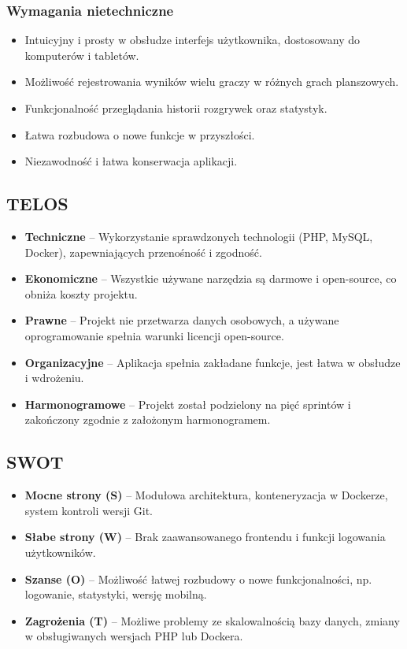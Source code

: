 \documentclass[12pt,a4paper]{article}
\begin{document}
\subsubsection*{Wymagania nietechniczne}
\begin{itemize}
    \item Intuicyjny i prosty w obsłudze interfejs użytkownika, dostosowany do komputerów i tabletów.
    \item Możliwość rejestrowania wyników wielu graczy w różnych grach planszowych.
    \item Funkcjonalność przeglądania historii rozgrywek oraz statystyk.
    \item Łatwa rozbudowa o nowe funkcje w przyszłości.
    \item Niezawodność i łatwa konserwacja aplikacji.
\end{itemize}

\subsection{TELOS}
\begin{itemize}
    \item \textbf{Techniczne} – Wykorzystanie sprawdzonych technologii (PHP, MySQL, Docker), zapewniających przenośność i zgodność.
    \item \textbf{Ekonomiczne} – Wszystkie używane narzędzia są darmowe i open-source, co obniża koszty projektu.
    \item \textbf{Prawne} – Projekt nie przetwarza danych osobowych, a używane oprogramowanie spełnia warunki licencji open-source.
    \item \textbf{Organizacyjne} – Aplikacja spełnia zakładane funkcje, jest łatwa w obsłudze i wdrożeniu.
    \item \textbf{Harmonogramowe} – Projekt został podzielony na pięć sprintów i zakończony zgodnie z założonym harmonogramem.
\end{itemize}

\subsection{SWOT}
\begin{itemize}
    \item \textbf{Mocne strony (S)} – Modułowa architektura, konteneryzacja w Dockerze, system kontroli wersji Git.
    \item \textbf{Słabe strony (W)} – Brak zaawansowanego frontendu i funkcji logowania użytkowników.
    \item \textbf{Szanse (O)} – Możliwość łatwej rozbudowy o nowe funkcjonalności, np. logowanie, statystyki, wersję mobilną.
    \item \textbf{Zagrożenia (T)} – Możliwe problemy ze skalowalnością bazy danych, zmiany w obsługiwanych wersjach PHP lub Dockera.
\end{itemize}
\end{document}
